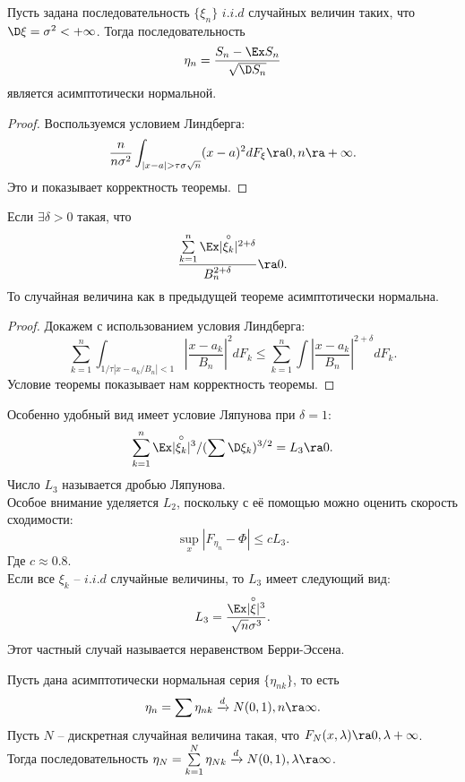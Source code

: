 \begin{theorem}[ЦПТ]
    Пусть задана последовательность $\{\xi_n\}$ $i.i.d$ случайных величин таких, что $\D \xi = \sigma^2 < +\infty$.
    Тогда последовательность
    \[
        \eta_n = \dfrac{S_n - \Ex S_n}{\sqrt {\D S_n}}
    \]
    является асимптотически нормальной.
\end{theorem}
\begin{proof}
    Воспользуемся условием Линдберга:
    \[
        \dfrac{n}{n\sigma^2} \int_{|x - a| > \tau \sigma \sqrt {n}} (x - a)^2 dF_{\xi} \ra 0, n \ra +\infty.
    \]
    Это и показывает корректность теоремы.
\end{proof}
\begin{theorem}
    Если $\exists \delta > 0$ такая, что
    \[
        \dfrac{\sum\limits_{k = 1}^n \Ex |\overset{\circ}{\xi_k}|^{2 + \delta}}{B_n^{2 + \delta}} \ra 0.
    \]
    То случайная величина как в предыдущей теореме асимптотически нормальна.
\end{theorem}
\begin{proof}
    Докажем с использованием условия Линдберга:
    \[
        \sum\limits_{k = 1}^{n} \int_{1/\tau |x - a_k/B_n| < 1} |\dfrac{x - a_k}{B_n}|^2 dF_{k} \leq \sum\limits_{k = 1}^n \int |\dfrac{x - a_k}{B_n}|^{2 + \delta}dF_{k}.
    \]
    Условие теоремы показывает нам корректность теоремы.
\end{proof}
\begin{note}
    Особенно удобный вид имеет условие Ляпунова при $\delta = 1$:
    \[
        \sum\limits_{k = 1}^{n} \Ex |\overset{\circ}{\xi_k}|^3 /(\sum \D \xi_k)^{3/2} = L_3 \ra 0.
    \]
    Число $L_3$ называется дробью Ляпунова. \\
    Особое внимание уделяется $L_2$, поскольку с её помощью можно оценить скорость сходимости:
    \[
        \sup\limits_{x} |F_{\eta_n} - \Phi| \leq c L_3.
    \]
    Где $c \approx 0.8$. \\
    Если все $\xi_k$ -- $i.i.d$ случайные величины, то $L_3$ имеет следующий вид:
    \[
        L_3 = \dfrac{\Ex |\overset{\circ }{\xi}|^3}{\sqrt {n}\sigma^3}.
    \]
    Этот частный случай называется неравенством Берри-Эссена.
\end{note}
\begin{theorem}[Натан]
    Пусть дана  асимптотически нормальная серия $\{\eta_{nk}\}$, то есть
    \[
        \eta_n = \sum \eta_{nk} \xrightarrow{d} N(0, 1), n \ra \infty.
    \]
    Пусть $N$ -- дискретная случайная величина такая, что $F_{N}(x, \lambda) \ra 0, \lambda +\infty$. \\
    Тогда последовательность $\eta_N = \sum\limits_{k = 1}^{N} \eta_{Nk} \xrightarrow{d} N(0, 1), \lambda \ra \infty$.
\end{theorem}

